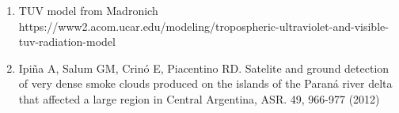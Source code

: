 \documentclass{article}
\begin{document}
\begin{multicols}{2}
\begin{enumerate}
\changefontsizes{12pt}
\vspace*{-0.4cm}
\item TUV model from Madronich \\https://www2.acom.ucar.edu/modeling/tropospheric-ultraviolet-and-visible-tuv-radiation-model
\vspace*{-0.3cm}
\item Ipiña A, Salum GM, Crinó E, Piacentino RD. Satelite and ground detection of very dense smoke clouds produced on the islands of the Paraná river delta that affected a large region in Central Argentina, ASR. 49, 966-977 (2012)
\vspace*{-0.3cm}
\end{enumerate}
\end{multicols}
\end{document}
